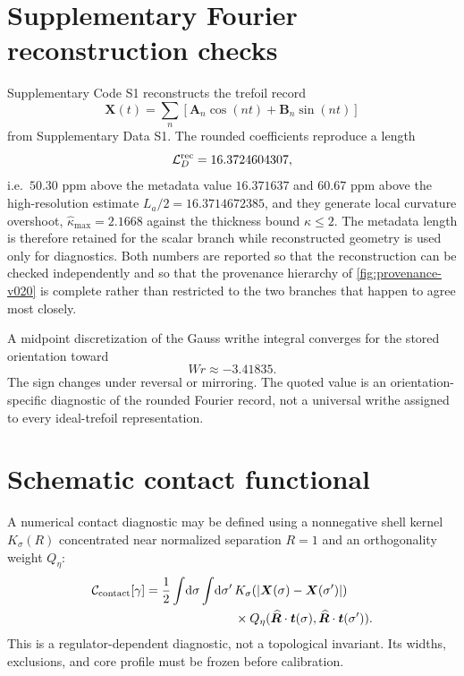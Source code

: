 \documentclass[aps,pre,preprint,notitlepage,nofootinbib,superscriptaddress]{revtex4-2}
\newcommand{\dd}{\mathrm d}
\newcommand{\calL}{\mathcal L}
\newcommand{\calC}{\mathcal C}
\newcommand{\unitvec}[1]{\widehat{\bm #1}}
\begin{document}
\appendix

\section{Supplementary Fourier reconstruction checks}
\label{app:fourier-reconstruction}

Supplementary Code S1 reconstructs the trefoil record
\begin{equation}
  \bm X(t)=\sum_n\left[\bm A_n\cos(nt)+\bm B_n\sin(nt)\right]
\end{equation}
from Supplementary Data S1.  The rounded coefficients reproduce a length
\begin{equation}
  \calL_D^{\rm rec}=16.3724604307,
\end{equation}
i.e.\ $50.30$ ppm above the metadata value $16.371637$ and $60.67$ ppm above the high-resolution estimate $L_a/2=16.3714672385$, and they generate local curvature overshoot, $\hat\kappa_{\max}=2.1668$ against the thickness bound $\hat\kappa\le2$.  The metadata length is therefore retained for the scalar branch while reconstructed geometry is used only for diagnostics.  Both numbers are reported so that the reconstruction can be checked independently and so that the provenance hierarchy of \cref{fig:provenance-v020} is complete rather than restricted to the two branches that happen to agree most closely.

A midpoint discretization of the Gauss writhe integral converges for the stored orientation toward
\begin{equation}
  Wr\approx-3.41835.
\end{equation}
The sign changes under reversal or mirroring.  The quoted value is an orientation-specific diagnostic of the rounded Fourier record, not a universal writhe assigned to every ideal-trefoil representation.

\section{Schematic contact functional}

A numerical contact diagnostic may be defined using a nonnegative shell kernel $K_\sigma(R)$ concentrated near normalized separation $R=1$ and an orthogonality weight $Q_\eta$:
\begin{align}
  \calC_{\rm contact}[\gamma]
  =\frac12\int\!\dd\sigma\int\!\dd\sigma'\,
  &K_\sigma(|\bm X(\sigma)-\bm X(\sigma')|)\\
  &\times Q_\eta(\unitvec{R}\cdot\bm t(\sigma),
                  \unitvec{R}\cdot\bm t(\sigma')).
\end{align}
This is a regulator-dependent diagnostic, not a topological invariant.  Its widths, exclusions, and core profile must be frozen before calibration.
\end{document}
